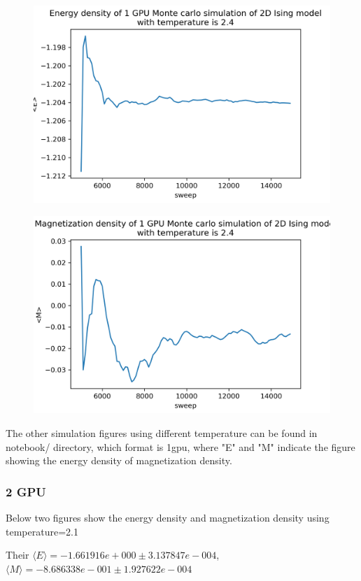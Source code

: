 \documentclass{article}
\begin{document}
	\begin{figure}[hb!]
		\centering
		\includegraphics[width=0.9\linewidth]{notebook/1gpu_2.4_E}
	\end{figure}
	\begin{figure}[hb!]
		\centering
		\includegraphics[width=0.9\linewidth]{notebook/1gpu_2.4_M}
	\end{figure}
	\newpage

	The other simulation figures using different temperature can be found in notebook/ directory, which format is 1gpu\textunderscore[E][M],
	where "E" and "M" indicate the figure showing the energy density of magnetization density.

	\subsubsection{2 GPU}
	Below two figures show the energy density and magnetization density using temperature=2.1

	Their $\langle E\rangle = -1.661916e+000 \pm 3.137847e-004$, $\langle M\rangle = -8.686338e-001 \pm 1.927622e-004$
\end{document}
